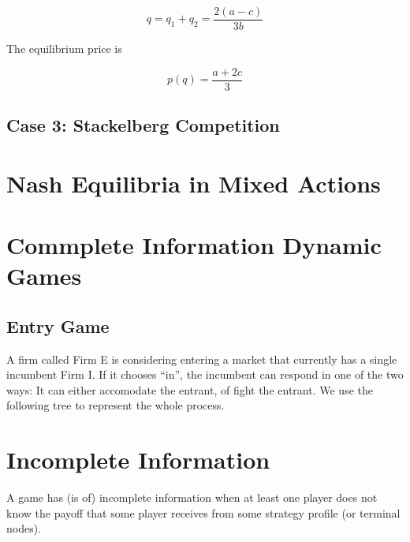 \documentclass[12pt, oneside]{article}
\begin{document}
\[
q = q_1 + q_2 = \frac{2(a - c)}{3b}
\]

The equilibrium price is

\[
p(q) = \frac{a + 2c}{3}
\]

\subsection{Case 3: Stackelberg Competition}
\newpage
\section{Nash Equilibria in Mixed Actions}
\section{Commplete Information Dynamic Games}
\subsection{Entry Game}
A firm called Firm E is considering entering a market that currently has a single incumbent Firm I. If it chooses “in”, the incumbent can respond in one of the two ways: It can either accomodate the entrant, of fight the entrant. We use the following tree to represent the whole process.



\section{Incomplete Information}
A game has (is of) incomplete information when at least one player does not know the payoff that some player receives from some strategy profile (or terminal nodes).
\end{document}
